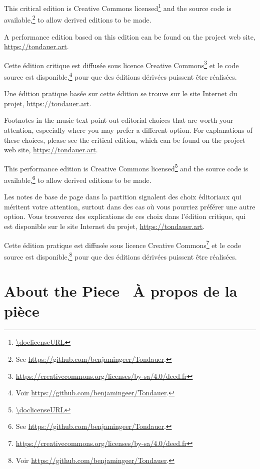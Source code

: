 \documentclass[a4paper, 12pt]{book}
\newcommand{\bigdot}[0]{{\Large \textbullet}}
\newcommand{\centerbigdot}[0]{\begin{center}\bigdot\end{center}}
\begin{document}
\ifdef{\critical}
  {%
    This critical edition is Creative Commons
    licensed\footnote{\url{\doclicenseURL}} and the source code is
    available,\footnote{See
      \url{https://github.com/benjamingeer/Tondauer}.} to allow
    derived editions to be made.

    A performance edition based on this edition can be found on
    the project web site, \url{https://tondauer.art}.

    \centerbigdot

    Cette édition critique est diffusée sous licence
    Creative Commons\footnote{\url{https://creativecommons.org/licenses/by-sa/4.0/deed.fr}}
    et le code source est disponible,\footnote{Voir
      \url{https://github.com/benjamingeer/Tondauer}.} pour
    que des éditions dérivées puissent être réalisées.

    Une édition pratique basée sur cette édition se trouve
    sur le site Internet du projet, \url{https://tondauer.art}.
  }{%
    Footnotes in the music text point out editorial choices that are
    worth your attention, especially where you may prefer a different
    option. For explanations of these choices, please see the critical
    edition, which can be found on the project web site,
    \url{https://tondauer.art}.

    This performance edition is Creative Commons
    licensed\footnote{\url{\doclicenseURL}} and the source code is
    available,\footnote{See
      \url{https://github.com/benjamingeer/Tondauer}.} to allow
    derived editions to be made.

    \centerbigdot

    Les notes de base de page dans la partition signalent des choix
    éditoriaux qui méritent votre attention, surtout dans des cas où
    vous pourriez préférer une autre option. Vous trouverez des
    explications de ces choix dans l'édition critique, qui est
    disponible sur le site Internet du projet,
    \url{https://tondauer.art}.

    Cette édition pratique est diffusée sous licence Creative
    Commons\footnote{\url{https://creativecommons.org/licenses/by-sa/4.0/deed.fr}}
    et le code source est disponible,\footnote{Voir
      \url{https://github.com/benjamingeer/Tondauer}.} pour que des
    éditions dérivées puissent être réalisées.

  }

\section*{About the Piece \bigdot\ À propos de la pièce}
\end{document}

